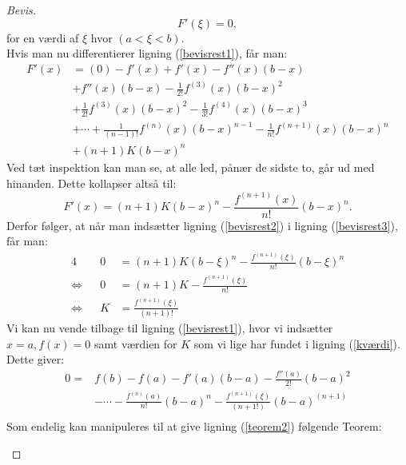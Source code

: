 \documentclass[12pt, a4paper]{article}
\begin{document}
\begin{refsection}
\begin{proof}[Bevis]
\begin{equation}\label{bevisrest2}
    F'(\xi)=0,
\end{equation}
for en værdi af $\xi$ hvor $(a<\xi<b)$.\\
Hvis man nu differentierer ligning (\ref{bevisrest1}), får man:
\begin{equation*}
    \begin{aligned}
        F'(x) &=(0) -f'(x)+f'(x)-f''(x)(b-x)\\
              &+f''(x)(b-x)-\frac{1}{2!}f^{(3)}(x)(b-x)^2\\
              &+\frac{1}{2!}f^{(3)}(x)(b-x)^2-\frac{1}{3!}f^{(4)}(x)(b-x)^3\\
              &+\cdots + \frac{1}{(n-1)!}f^{(n)}(x)(b-x)^{n-1}-\frac{1}{n!}f^{(n+1)}(x)(b-x)^n\\
              &+(n+1)K(b-x)^n
    \end{aligned}
\end{equation*}
Ved tæt inspektion kan man se, at alle led, pånær de sidste to, går ud med hinanden. Dette kollapser altså til:
\begin{equation}\label{bevisrest3}
    F'(x)=(n+1)K(b-x)^n-\frac{f^{(n+1)}(x)}{n!}(b-x)^n.
\end{equation}
Derfor følger, at når man indsætter ligning (\ref{bevisrest2}) i ligning (\ref{bevisrest3}), får man:
    \begin{alignat}{4}
       && 0&=(n+1)K(b-\xi)^n-\frac{f^{(n+1)}(\xi)}{n!}(b-\xi)^n\nonumber\\
        \Leftrightarrow&&  0&=(n+1)K-\frac{f^{(n+1)}(\xi)}{n!}\nonumber\\
        \Leftrightarrow&&  K&=\frac{f^{(n+1)}(\xi)}{(n+1)!}\label{kværdi}
    \end{alignat}
    Vi kan nu vende tilbage til ligning (\ref{bevisrest1}), hvor vi indsætter $x=a,f(x)=0$ samt værdien for  $K$ som vi lige har fundet i ligning (\ref{kværdi}). Dette giver:
    \begin{equation*}
        \begin{aligned}
         0=&f(b)-f(a)-f'(a)(b-a)-\frac{f''(a)}{2!}(b-a)^2\\
         &-\cdots-\frac{f^{(n)}(a)}{n!}(b-a)^n-\frac{f^{(n+1)}(\xi)}{(n+1!)}(b-a)^{(n+1)}\\
         \end{aligned}
     \end{equation*}
     Som endelig kan manipuleres til at give ligning (\ref{teorem2}) følgende Teorem:
     \newpage
     \begin{mdframed}

\end{mdframed}
\end{proof}
\end{refsection}
\end{document}
